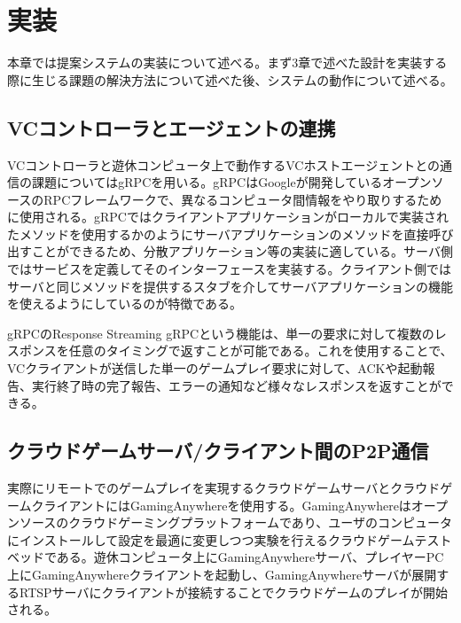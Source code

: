 \section{実装}
本章では提案システムの実装について述べる。まず3章で述べた設計を実装する際に生じる課題の解決方法について述べた後、システムの動作について述べる。




\subsection{VCコントローラとエージェントの連携}
VCコントローラと遊休コンピュータ上で動作するVCホストエージェントとの通信の課題についてはgRPC\cite{grpc}を用いる。gRPCはGoogleが開発しているオープンソースのRPCフレームワークで、異なるコンピュータ間情報をやり取りするために使用される。gRPCではクライアントアプリケーションがローカルで実装されたメソッドを使用するかのようにサーバアプリケーションのメソッドを直接呼び出すことができるため、分散アプリケーション等の実装に適している。サーバ側ではサービスを定義してそのインターフェースを実装する。クライアント側ではサーバと同じメソッドを提供するスタブを介してサーバアプリケーションの機能を使えるようにしているのが特徴である。

gRPCのResponse Streaming gRPCという機能は、単一の要求に対して複数のレスポンスを任意のタイミングで返すことが可能である。これを使用することで、VCクライアントが送信した単一のゲームプレイ要求に対して、ACKや起動報告、実行終了時の完了報告、エラーの通知など様々なレスポンスを返すことができる。

\subsection{クラウドゲームサーバ/クライアント間のP2P通信}
実際にリモートでのゲームプレイを実現するクラウドゲームサーバとクラウドゲームクライアントにはGamingAnywhereを使用する。GamingAnywhereはオープンソースのクラウドゲーミングプラットフォームであり、ユーザのコンピュータにインストールして設定を最適に変更しつつ実験を行えるクラウドゲームテストベッドである。遊休コンピュータ上にGamingAnywhereサーバ、プレイヤーPC上にGamingAnywhereクライアントを起動し、GamingAnywhereサーバが展開するRTSPサーバにクライアントが接続することでクラウドゲームのプレイが開始される。

